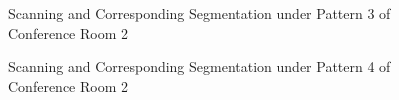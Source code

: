\documentclass[11pt, a4paper,oneside,chapterprefix=false]{scrbook}
\begin{document}
\begin{figure}[H]
    \centering
      \label{fig:conf2 2 occluded} \hfill
     \label{fig:conf2 2 seg}
    \caption{Scanning and Corresponding Segmentation under Pattern 3 of Conference Room 2}
    \label{fig:conf2 2 occ and seg}
\end{figure}

\begin{figure}[H]
    \centering
      \label{fig:conf2 4 occluded} \hfill
     \label{fig:conf2 4 seg}
    \caption{Scanning and Corresponding Segmentation  under Pattern 4 of Conference Room 2}
    \label{fig:conf2 4 occ and seg}
\end{figure}
\end{document}
